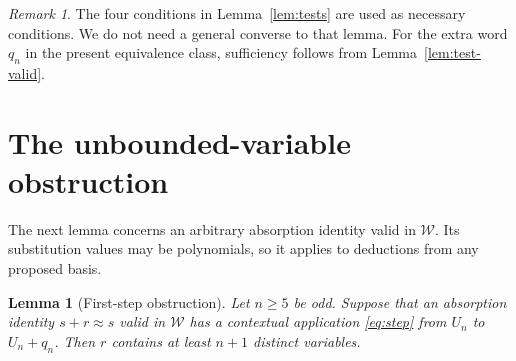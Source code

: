 \documentclass[11pt,reqno]{amsart}
\numberwithin{equation}{section}
\newtheorem{lemma}[theorem]{Lemma}
\theoremstyle{definition}
\theoremstyle{remark}
\newtheorem{remark}[theorem]{Remark}
\newcommand{\W}{\mathcal W}
\newcommand{\eqid}{\approx}
\begin{document}
\begin{remark}
The four conditions in Lemma~\ref{lem:tests} are used as necessary
conditions. We do not need a general converse to that lemma.
For the extra word $q_n$ in the present equivalence class,
sufficiency follows from Lemma~\ref{lem:test-valid}.
\end{remark}

\section{The unbounded-variable obstruction}
\label{sec:nfb}

The next lemma concerns an arbitrary absorption identity valid in
$\W$. Its substitution values may be polynomials, so it applies
to deductions from any proposed basis.

\begin{lemma}[First-step obstruction]\label{lem:step}
Let $n\geq5$ be odd. Suppose that an absorption identity
$s+r\eqid s$ valid in $\W$ has a contextual application
\eqref{eq:step} from $U_n$ to $U_n+q_n$. Then $r$ contains
at least $n+1$ distinct variables.
\end{lemma}
\end{document}
